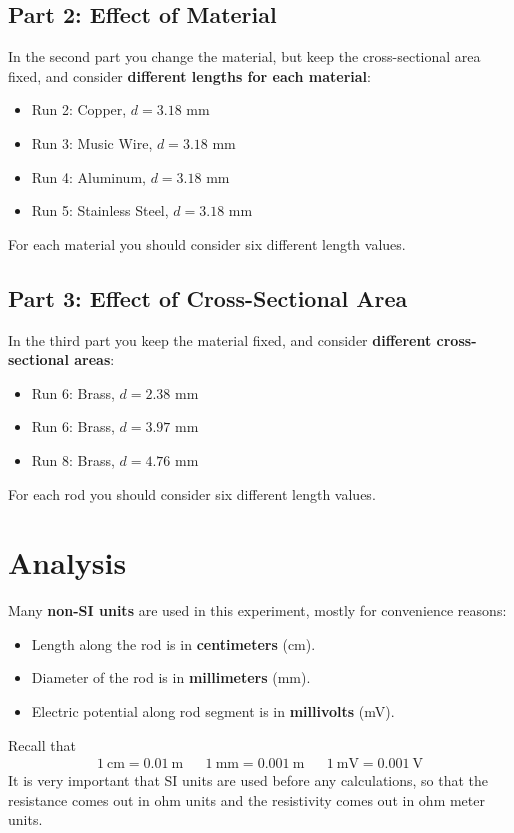\subsection{Part 2: Effect of Material}
%
In the second part you change the material, but keep the cross-sectional area fixed, and consider \textbf{different lengths for each material}:
\begin{itemize}
	\item Run 2: Copper, $d = 3.18$ mm
	\item Run 3: Music Wire, $d = 3.18$ mm
	\item Run 4: Aluminum, $d = 3.18$ mm
	\item Run 5: Stainless Steel, $d = 3.18$ mm
\end{itemize}
For each material you should consider six different length values.
%
\subsection{Part 3: Effect of Cross-Sectional Area}
%
In the third part you keep the material fixed, and consider \textbf{different cross-sectional areas}:
\begin{itemize}
	\item Run 6: Brass, $d = 2.38$ mm
	\item Run 6: Brass, $d = 3.97$ mm
	\item Run 8: Brass, $d = 4.76$ mm
\end{itemize}
For each rod you should consider six different length values.
%
\section{Analysis}
%
Many \textbf{non-SI units} are used in this experiment, mostly for convenience reasons:
\begin{itemize}
	\item Length along the rod is in \textbf{centimeters} (cm).
	\item Diameter of the rod is in \textbf{millimeters} (mm).
	\item Electric potential along rod segment is in \textbf{millivolts} (mV).
\end{itemize}
Recall that
\begin{align}
	1 \ \text{cm} = 0.01 \ \text{m} && 1 \ \text{mm} = 0.001 \ \text{m} && 1 \ \text{mV} = 0.001 \ \text{V}
\end{align}
It is very important that SI units are used before any calculations, so that the resistance comes out in ohm units and the resistivity comes out in ohm {\textperiodcentered} meter units.
%
